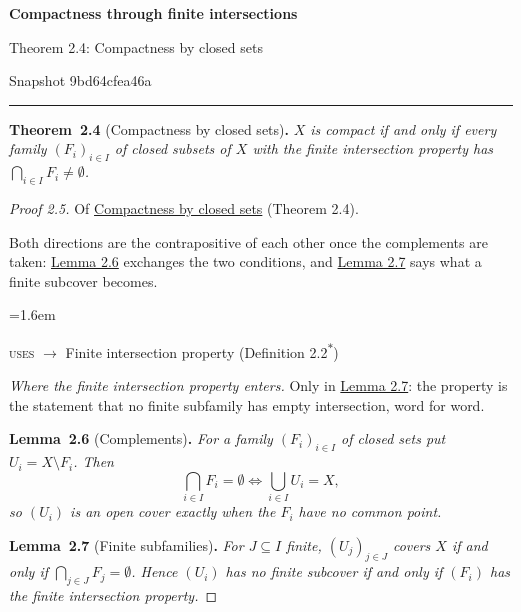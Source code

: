 \documentclass[11pt]{article}
\newenvironment{bpstatement}[2]{\par\addvspace{0.6\baselineskip}\noindent\textbf{#1}#2\textbf{.}\enspace\ignorespaces}
  {\par\addvspace{0.4\baselineskip}}
\newenvironment{bpstatementit}[2]{\begin{bpstatement}{#1}{#2}\itshape\ignorespaces}{\end{bpstatement}}
\newenvironment{bpstep}[1]{\par\addvspace{0.3\baselineskip}\begin{list}{}{\leftmargin=1.6em\rightmargin=0pt\topsep=0pt}\item\relax
  {\small\color{bpmuted}#1}\par\nopagebreak}{\end{list}\par}
\newcommand{\bpout}[1]{#1\textsuperscript{\hyperlink{bp-outside}{\ensuremath{\ast}}}}
\begin{document}
\pagestyle{plain}
\begin{center}
{\LARGE\bfseries Compactness through finite intersections\par}
\vspace{0.7em}
{\large Theorem 2.4: Compactness by closed sets\par}
\vspace{0.5em}
{\small\color{bpmuted}Snapshot 9bd64cfea46a\par}
\end{center}
\vspace{0.5em}
{\small\tableofcontents}
\bigskip\hrule\bigskip

\label{bp1}%
\begin{bpstatementit}{Theorem~2.4}{ (Compactness by closed sets)}
\(X\) is compact if and only if every family \((F_i)_{i \in I}\) of closed subsets of \(X\) with the finite intersection property has \(\bigcap_{i \in I} F_i \neq \emptyset\).
\end{bpstatementit}
\label{bp2}%
\begin{proof}[{Proof 2.5}]
{\small\color{bpmuted}Of \hyperref[bp1]{Compactness by closed sets} (Theorem 2.4).}\par
Both directions are the contrapositive of each other once the complements are taken: \hyperref[bp3]{Lemma 2.6} exchanges the two conditions, and \hyperref[bp4]{Lemma 2.7} says what a finite subcover becomes.
\begin{bpstep}{\textsc{uses} \ensuremath{\to} Finite intersection property (\bpout{Definition 2.2})}\label{bp5}%
\textit{Where the finite intersection property enters.}
Only in \hyperref[bp4]{Lemma 2.7}: the property is the statement that no finite subfamily has empty intersection, word for word.
\end{bpstep}
\label{bp3}%
\begin{bpstatementit}{Lemma~2.6}{ (Complements)}
For a family \((F_i)_{i \in I}\) of closed sets put \(U_i = X \setminus F_i\). Then \[
\bigcap_{i \in I} F_i = \emptyset
\iff
\bigcup_{i \in I} U_i = X ,
\] so \((U_i)\) is an open cover exactly when the \(F_i\) have no common point.
\end{bpstatementit}

\label{bp4}%
\begin{bpstatementit}{Lemma~2.7}{ (Finite subfamilies)}
For \(J \subseteq I\) finite, \((U_j)_{j \in J}\) covers \(X\) if and only if \(\bigcap_{j \in J} F_j = \emptyset\).  Hence \((U_i)\) has no finite subcover if and only if \((F_i)\) has the finite intersection property.
\end{bpstatementit}

\end{proof}
\end{document}

